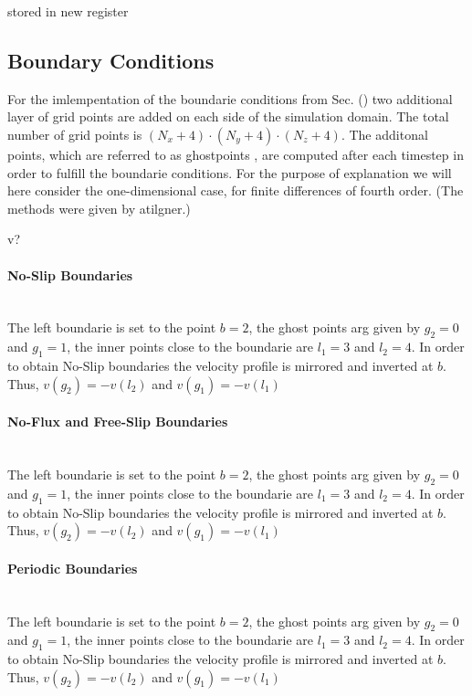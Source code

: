 stored in new register

\subsection{Boundary Conditions}

For the imlempentation of the boundarie conditions from Sec. () two additional layer of grid points
are added on each side of the simulation domain.
The total number of grid points is ${(N_x + 4)\cdot(N_y + 4)\cdot(N_z + 4)}$.
The additonal points, which are referred to as ghostpoints \citep{ctie},
are computed after each timestep in order to fulfill the boundarie conditions.
For the purpose of explanation we will here consider the one-dimensional case,
for finite differences of fourth order. (The methods were given by atilgner.)

v?

\paragraph{No-Slip Boundaries}\mbox{}\\

The left boundarie is set to the point $b=2$,
the ghost points arg given by $g_2=0$ and $g_1=1$, the inner points close
to the boundarie are $l_1=3$ and $l_2=4$.
In order to obtain No-Slip boundaries the velocity profile is mirrored and inverted
at $b$. Thus, $v(g_2) = -v(l_2)$ and  $v(g_1) = -v(l_1)$



\paragraph{No-Flux and Free-Slip Boundaries}\mbox{}\\

The left boundarie is set to the point $b=2$,
the ghost points arg given by $g_2=0$ and $g_1=1$, the inner points close
to the boundarie are $l_1=3$ and $l_2=4$.
In order to obtain No-Slip boundaries the velocity profile is mirrored and inverted
at $b$. Thus, $v(g_2) = -v(l_2)$ and  $v(g_1) = -v(l_1)$


\paragraph{Periodic Boundaries}\mbox{}\\

The left boundarie is set to the point $b=2$,
the ghost points arg given by $g_2=0$ and $g_1=1$, the inner points close
to the boundarie are $l_1=3$ and $l_2=4$.
In order to obtain No-Slip boundaries the velocity profile is mirrored and inverted
at $b$. Thus, $v(g_2) = -v(l_2)$ and  $v(g_1) = -v(l_1)$

